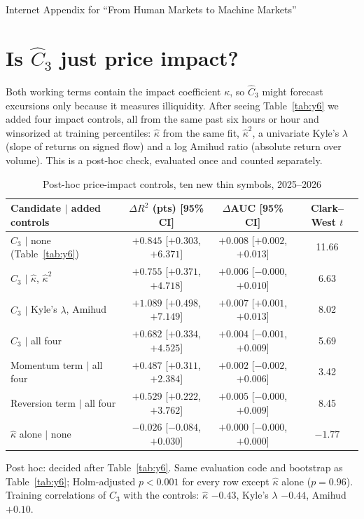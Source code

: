 \documentclass[12pt]{article}
\theoremstyle{definition}
\theoremstyle{remark}
\begin{document}
\clearpage
\setcounter{page}{1}
\begin{center}{\Large Internet Appendix for ``From Human Markets to Machine Markets''}\end{center}
\label{app:iastart}
\section{Is $\hat C_3$ just price impact?}
Both working terms contain the impact coefficient $\kappa$, so $\hat C_3$ might forecast excursions only because it measures illiquidity. After seeing Table~\ref{tab:y6} we added four impact controls, all from the same past six hours or hour and winsorized at training percentiles: $\hat\kappa$ from the same fit, $\hat\kappa^2$, a univariate Kyle's $\lambda$ \citep{kyle1985} (slope of returns on signed flow) and a log Amihud ratio \citep{amihud2002} (absolute return over volume). This is a post-hoc check, evaluated once and counted separately.

\begin{table}[t]\centering\small
\begin{threeparttable}
\caption{Post-hoc price-impact controls, ten new thin symbols, 2025--2026}\label{tab:y8}
\begin{tabular}{lccc}
\toprule
Candidate $\mid$ added controls & $\Delta R^2$ (pts) [95\% CI] & $\Delta$AUC [95\% CI] & Clark--West $t$\\
\midrule
$\hat C_3$ $\mid$ none (Table~\ref{tab:y6}) & $+0.845$ [$+0.303$, $+6.371$] & $+0.008$ [$+0.002$, $+0.013$] & 11.66\\
$\hat C_3$ $\mid$ $\hat\kappa$, $\hat\kappa^2$ & $+0.755$ [$+0.371$, $+4.718$] & $+0.006$ [$-0.000$, $+0.010$] & 6.63\\
$\hat C_3$ $\mid$ Kyle's $\lambda$, Amihud & $+1.089$ [$+0.498$, $+7.149$] & $+0.007$ [$+0.001$, $+0.013$] & 8.02\\
$\hat C_3$ $\mid$ all four & $+0.682$ [$+0.334$, $+4.525$] & $+0.004$ [$-0.001$, $+0.009$] & 5.69\\
Momentum term $\mid$ all four & $+0.487$ [$+0.311$, $+2.384$] & $+0.002$ [$-0.002$, $+0.006$] & 3.42\\
Reversion term $\mid$ all four & $+0.529$ [$+0.222$, $+3.762$] & $+0.005$ [$-0.000$, $+0.009$] & 8.45\\
$\hat\kappa$ alone $\mid$ none & $-0.026$ [$-0.084$, $+0.030$] & $+0.000$ [$-0.000$, $+0.000$] & $-1.77$\\
\bottomrule
\end{tabular}
\begin{tablenotes}\footnotesize\item Post hoc: decided after Table~\ref{tab:y6}. Same evaluation code and bootstrap as Table~\ref{tab:y6}; Holm-adjusted $p<0.001$ for every row except $\hat\kappa$ alone ($p=0.96$). Training correlations of $\hat C_3$ with the controls: $\hat\kappa$ $-0.43$, Kyle's $\lambda$ $-0.44$, Amihud $+0.10$. \end{tablenotes}
\end{threeparttable}
\end{table}
\end{document}
